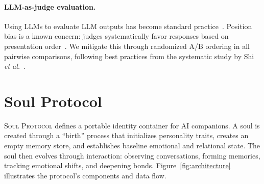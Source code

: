 \documentclass{article}
\newcommand{\soul}{\textsc{Soul Protocol}}
\newcommand{\etal}{\textit{et al.}}
\begin{document}
\paragraph{LLM-as-judge evaluation.}
Using LLMs to evaluate LLM outputs has become standard practice~\cite{zheng2024judging}. Position bias is a known concern: judges systematically favor responses based on presentation order~\cite{shi2025positionbias}. We mitigate this through randomized A/B ordering in all pairwise comparisons, following best practices from the systematic study by Shi \etal{}~\cite{shi2025positionbias}.


\section{Soul Protocol}
\label{sec:protocol}

\soul{} defines a portable identity container for AI companions. A soul is created through a ``birth'' process that initializes personality traits, creates an empty memory store, and establishes baseline emotional and relational state. The soul then evolves through interaction: observing conversations, forming memories, tracking emotional shifts, and deepening bonds. Figure~\ref{fig:architecture} illustrates the protocol's components and data flow.
\end{document}
